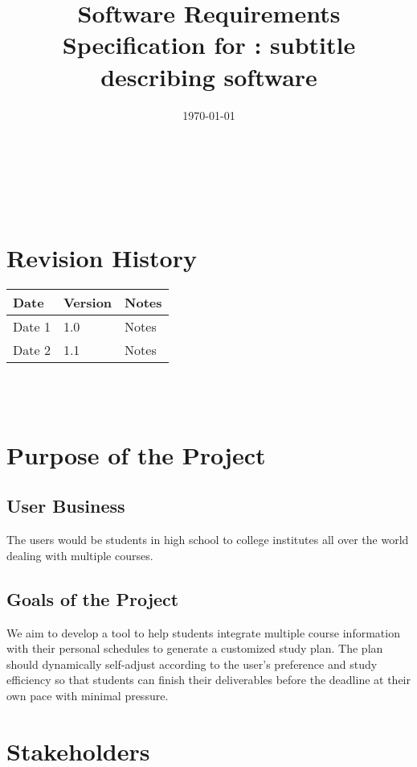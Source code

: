 \documentclass[12pt]{article}
\begin{document}
\title{Software Requirements Specification for \progname: subtitle describing software} 
\author{\authname}
\date{\today}
	
\maketitle

~\newpage


\tableofcontents

~\newpage

\section*{Revision History}

\begin{tabularx}{\textwidth}{p{3cm}p{2cm}X}
\toprule {\textbf{Date}} & {\textbf{Version}} & {\textbf{Notes}}\\
\midrule
Date 1 & 1.0 & Notes\\
Date 2 & 1.1 & Notes\\
\bottomrule
\end{tabularx}

~\\

~\newpage
\section{Purpose of the Project}
\subsection{User Business}
The users would be students in high school to college institutes all over the world dealing with multiple courses.

\subsection{Goals of the Project}
We aim to develop a tool to help students integrate multiple course information with their personal schedules to generate a customized study plan. The plan should dynamically self-adjust according to the user's preference and study efficiency so that students can finish their deliverables before the deadline at their own pace with minimal pressure.
\section{Stakeholders}
\end{document}
